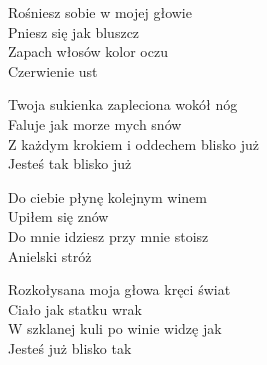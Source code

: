 \begin{text}
    Rośniesz sobie w mojej głowie\\
    Pniesz się jak bluszcz\\
    Zapach włosów kolor oczu\\
    Czerwienie ust

    Twoja sukienka zapleciona wokół nóg\\
    Faluje jak morze mych snów\\
    Z każdym krokiem i oddechem blisko już\\
    Jesteś tak blisko już

    Do ciebie płynę kolejnym winem\\
    Upiłem się znów\\
    Do mnie idziesz przy mnie stoisz\\
    Anielski stróż

    Rozkołysana moja głowa kręci świat\\
    Ciało jak statku wrak\\
    W szklanej kuli po winie widzę jak\\
    Jesteś już blisko tak
\end{text}
\begin{chord}

\end{chord}